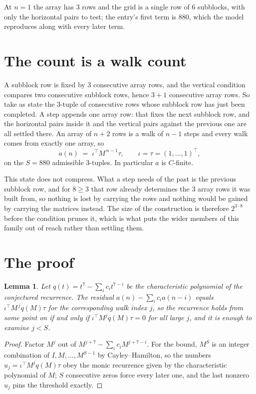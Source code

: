 \documentclass[11pt,a4paper]{article}
\theoremstyle{plain}
\newtheorem{lemma}[theorem]{Lemma}
\theoremstyle{definition}
\begin{document}
At $n=1$ the array has $3$ rows and the grid is a single row of $6$
subblocks, with only the horizontal pairs to test; the entry's first term is
$880$, which the model reproduces along with every later term.

\section{The count is a walk count}

A subblock row is fixed by $3$ consecutive array rows, and the vertical condition compares
two consecutive subblock rows, hence $3+1$ consecutive array rows. So take as state the
$3$-tuple of consecutive rows whose subblock row has just been completed. A step appends one
array row: that fixes the next subblock row, and the horizontal pairs inside it and the
vertical pairs against the previous one are all settled there. An array of $n+2$ rows is
a walk of $n-1$ steps and every walk comes from exactly one array, so
\[
a(n)\;=\;\iota^{\!\top}M^{\,n-1}\tau,\qquad\iota=\tau=(1,\dots,1)^{\!\top},
\]
on the $S=880$ admissible $3$-tuples. In particular $a$ is $C$-finite.

This state does not compress. What a step needs of the past is the previous subblock row, and
for $8\ge3$ that row already determines the $3$ array rows it was built from, so nothing
is lost by carrying the rows and nothing would be gained by carrying the matrices instead. The
size of the construction is therefore $2^{3\cdot8}$ before the condition prunes
it, which is what puts the wider members of this family out of reach rather than settling them.

\section{The proof}

\begin{lemma}\label{lem:crit}
Let $q(t)=t^{7}-\sum_i c_it^{7-i}$ be the characteristic polynomial of the
conjectured recurrence. The residual $a(n)-\sum_ic_ia(n-i)$ equals
$\iota^{\!\top}M^{\,j}q(M)\tau$ for the corresponding walk index $j$, so the recurrence
holds from some point on if and only if $\iota^{\!\top}M^{j}q(M)\tau=0$ for all large $j$,
and it is enough to examine $j<S$.
\end{lemma}

\begin{proof}
Factor $M^{j}$ out of $M^{j+7}-\sum_ic_iM^{j+7-i}$. For the bound, $M^{S}$
is an integer combination of $I,M,\dots,M^{S-1}$ by Cayley--Hamilton, so the numbers
$u_j=\iota^{\!\top}M^{j}q(M)\tau$ obey the monic recurrence given by the characteristic
polynomial of $M$; $S$ consecutive zeros force every later one, and the last nonzero $u_j$
pins the threshold exactly.
\end{proof}
\end{document}

